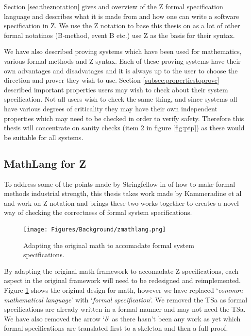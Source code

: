 Section \ref{sec:theznotation} gives and overview of the Z formal specification language and describes what it is made from and how one can write a software specification in Z. We use the Z notation to base this thesis on as a lot of other formal notatinos (B-method, event B etc.) use Z as the basis for their syntax.

We have also described proving systems which have been used for mathematics, various formal methods and Z syntax. Each of these proving systems have their own advantages and disadvatages and it is always up to the user to choose the direction and prover they wish to use. Section \ref{subsec:propertiestoprove} described important properties users may wish to check about their system specification. Not all users wish to check the same thing, and since  systems all have various degrees of criticality they may have their own independent properties which may need to be checked in order to verify safety. Therefore this thesis will concentrate on sanity checks (item 2 in figure \ref{fig:ptp}) as these would be suitable for all systems.

\subsection{MathLang for Z}

To address some of the points made by Stringfellow in \cite{fmpresetation} of how to make formal methods industrial strength, this thesis takes work made by Kammeradine et al \cite{newmathlang} and work on Z notation \cite{spiveyreferencemanual} and brings these two works together to creates a novel way of checking the correctness of formal system specifications.

\begin{figure}[H]
\begin{center}
\texttt{[image: Figures/Background/zmathlang.png]}
\end{center}
\caption{Adapting the original \gls{math} to accomadate formal system specifications. \label{fig:zmathlang}}
\end{figure}

By adapting the original \gls{math} framework to accomadate Z specifications, each aspect in the original framework will need to be redesigned and reimplemented. Figure \ref{fig:zmathlang} shows the original design for \gls{math}, however we have replaced `\emph{common mathematical language}' with `\emph{formal specification}'. We removed the TSa as formal specifications are already written in a formal manner and may not need the TSa. We have also removed the arrow `\emph{b}' as there hasn't been any work as yet which formal specifications are translated first to a skeleton and then a full proof.

